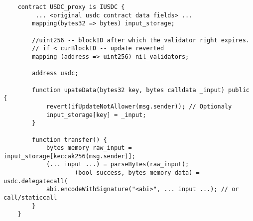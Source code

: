 \begin{verbatim}
    contract USDC_proxy is IUSDC { 
         ... <original usdc contract data fields> ...
        mapping(bytes32 => bytes) input_storage;

        //uint256 -- blockID after which the validator right expires.
        // if < curBlockID -- update reverted
        mapping (address => uint256) nil_validators;  

        address usdc;

        function upateData(bytes32 key, bytes calldata _input) public {
            revert(ifUpdateNotAllower(msg.sender)); // Optionaly
            input_storage[key] = _input;
        }

        function transfer() {
            bytes memory raw_input = input_storage[keccak256(msg.sender)];
            (... input ...) = parseBytes(raw_input);
                    (bool success, bytes memory data) = usdc.delegatecall(
            abi.encodeWithSignature("<abi>", ... input ...); // or call/staticcall
        }
    }
\end{verbatim}



